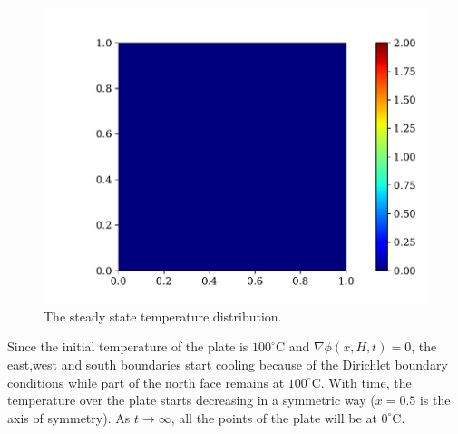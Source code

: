 \documentclass[a4paper, 11pt]{article}
\begin{document}
\begin{figure}[ht!]
  \centering
  \includegraphics[width=0.5\linewidth]{2sec.pdf}
  \caption{The steady state temperature distribution.}
  \label{fig:sub31}
\label{fig:sub32}
\end{figure}
Since the initial temperature of the plate is $100^{\circ}$C and $\nabla \phi(x,H,t)=0$, the east,west and south boundaries start cooling because of the Dirichlet boundary conditions while part of the north face remains at $100^{\circ}$C. With time, the temperature over the plate starts decreasing in a symmetric way ($x=0.5$ is the axis of symmetry).  As $t \to \infty$, all the points of the plate will be at $0^{\circ}$C.
\end{document}
